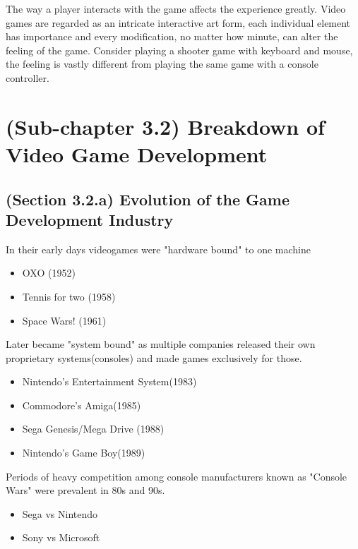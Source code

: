 \documentclass[a4paper,one side,12pt]{book}
\begin{document}
The way a player interacts with the game affects the experience greatly.
Video games are regarded as an intricate interactive art form, each
individual element has importance and every modification, no matter how
minute, can alter the feeling of the game. Consider playing a shooter
game with keyboard and mouse, the feeling is vastly different from
playing the same game with a console controller.

\section{(Sub-chapter 3.2) Breakdown of Video Game Development}


\subsection{(Section 3.2.a) Evolution of the Game Development Industry}

In their early days videogames were "hardware bound" to one machine

\begin{itemize}
\item
  OXO (1952) \cite{videogame_debate}
\item
  Tennis for two (1958) \cite{videogame_debate}
\item
  Space Wars! (1961) \cite{videogame_debate}
\end{itemize}

Later became "system bound" as multiple companies released their own
proprietary systems(consoles) and made games exclusively for those.

\begin{itemize}
\item
  Nintendo's Entertainment System(1983) 
\item
  Commodore's Amiga(1985)
\item
  Sega Genesis/Mega Drive (1988)
\item
  Nintendo's Game Boy(1989)
\end{itemize}

Periods of heavy competition among console manufacturers known as
"Console Wars"\cite{console_war} were prevalent in 80s and 90s.

\begin{itemize}
\item
  Sega vs Nintendo
\item
  Sony vs Microsoft
\end{itemize}
\end{document}
